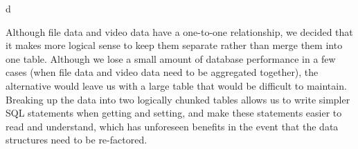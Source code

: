 d\documentclass[a4paper,12pt]{report}
\begin{document}
Although file data and video data have a one-to-one relationship, we decided that it makes more logical sense to keep them separate rather than merge them into one table. 
Although we lose a small amount of database performance in a few cases (when file data and video data need to be aggregated together), the alternative would leave us with a large table that would be difficult to maintain. Breaking up the data into two logically chunked tables allows us to write simpler SQL statements when getting and setting, and make these statements easier to read and understand, which has unforeseen benefits in the event that the data structures need to be re-factored.
\end{document}
